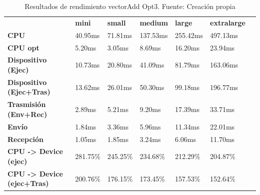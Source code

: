 \begin{table}[H]
    \centering
    \begin{tabular}{lllllll}
    \rowcolor[HTML]{DAE8FC} \ &  \textbf{mini} &  \textbf{small} &  \textbf{medium} &  \textbf{	large} &  \textbf{	extralarge} \\
    \cellcolor[HTML]{DAE8FC} \textbf{CPU} & 40.95ms & 71.81ms & 137.53ms & 	255.42ms & 	497.13ms \\
    \rowcolor[HTML]{EFEFEF} \cellcolor[HTML]{DAE8FC} \textbf{CPU opt} & 5.20ms & 3.05ms & 8.69ms & 	16.20ms & 	23.94ms \\
    \cellcolor[HTML]{DAE8FC} \textbf{Dispositivo (Ejec)} & 10.73ms & 20.80ms & 41.09ms & 	81.79ms & 	163.06ms \\
    \rowcolor[HTML]{EFEFEF} \cellcolor[HTML]{DAE8FC} \textbf{Dispositivo (Ejec+Tras)} & 13.62ms & 26.01ms & 50.30ms & 	99.18ms & 	196.77ms \\
    \cellcolor[HTML]{DAE8FC} \textbf{Trasmisión (Env+Rec)} & 2.89ms & 5.21ms & 9.20ms & 	17.39ms & 	33.71ms \\
    \rowcolor[HTML]{EFEFEF} \cellcolor[HTML]{DAE8FC} \textbf{Envío} & 1.84ms & 3.36ms & 5.96ms & 	11.34ms & 	22.01ms \\
    \cellcolor[HTML]{DAE8FC} \textbf{Recepción} & 1.05ms & 1.85ms & 3.24ms & 	6.06ms & 	11.70ms \\
    \rowcolor[HTML]{EFEFEF} \cellcolor[HTML]{DAE8FC} \textbf{CPU -> Device (ejec)} & 281.75\% & 245.25\% & 234.68\% & 	212.29\% & 	204.87\% \\
    \cellcolor[HTML]{DAE8FC} \textbf{CPU -> Device (ejec+Tras)} & 200.76\% & 176.15\% & 173.45\% & 	157.53\% & 	152.64\% \\
    \end{tabular}
    \caption[Resultados de rendimiento vectorAdd Opt3]{{Resultados de rendimiento vectorAdd Opt3. Fuente: Creación propia}}
    \label{table_test_vectorAdd_Opt3_hw_performanceResults}
\end{table}